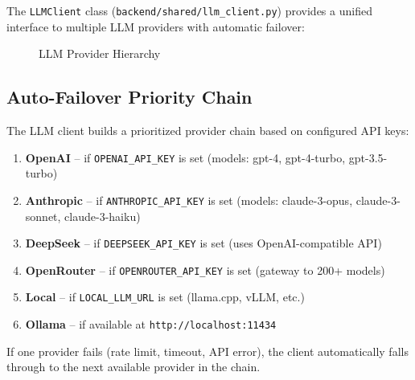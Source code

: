 \documentclass[12pt,a4paper,twoside]{report}
\begin{document}
The \texttt{LLMClient} class (\texttt{backend/shared/llm\_client.py}) provides a unified interface to multiple LLM providers with automatic failover:

\begin{figure}[H]
\centering
{}
\caption{LLM Provider Hierarchy}
\label{fig:llm-providers}
\end{figure}

\subsection{Auto-Failover Priority Chain}

The LLM client builds a prioritized provider chain based on configured API keys:

\begin{enumerate}[leftmargin=*]
    \item \textbf{OpenAI} -- if \texttt{OPENAI\_API\_KEY} is set (models: gpt-4, gpt-4-turbo, gpt-3.5-turbo)
    \item \textbf{Anthropic} -- if \texttt{ANTHROPIC\_API\_KEY} is set (models: claude-3-opus, claude-3-sonnet, claude-3-haiku)
    \item \textbf{DeepSeek} -- if \texttt{DEEPSEEK\_API\_KEY} is set (uses OpenAI-compatible API)
    \item \textbf{OpenRouter} -- if \texttt{OPENROUTER\_API\_KEY} is set (gateway to 200+ models)
    \item \textbf{Local} -- if \texttt{LOCAL\_LLM\_URL} is set (llama.cpp, vLLM, etc.)
    \item \textbf{Ollama} -- if available at \texttt{http://localhost:11434}
\end{enumerate}

If one provider fails (rate limit, timeout, API error), the client automatically falls through to the next available provider in the chain.
\end{document}
